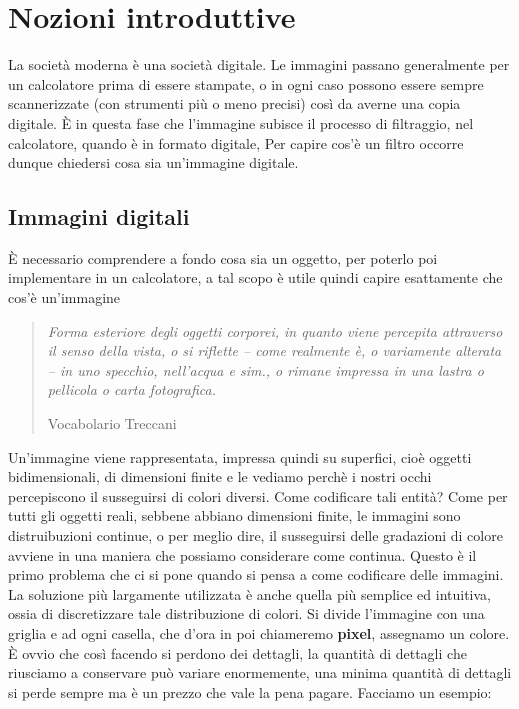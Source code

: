 \newpage
\section{Nozioni introduttive}
La società moderna è una società digitale. Le immagini passano generalmente per un calcolatore prima di essere stampate, o in ogni caso possono essere sempre scannerizzate (con strumenti più o meno precisi) così da averne una copia digitale.
\`E in questa fase che l'immagine subisce il processo di filtraggio, nel calcolatore, quando è in formato digitale, Per capire cos'è un filtro occorre dunque chiedersi cosa sia un'immagine digitale.

\subsection{Immagini digitali}
\`E necessario comprendere a fondo cosa sia un oggetto, per poterlo poi implementare in un calcolatore, a tal scopo è utile quindi capire esattamente che cos'è un'immagine

\begin{quote}
\epigraph{\textit{Forma esteriore degli oggetti corporei, in quanto viene percepita attraverso il senso della vista, o si riflette – come realmente è, o variamente alterata – in uno specchio, nell’acqua e sim., o rimane impressa in una lastra o pellicola o carta fotografica.}}{Vocabolario Treccani}
\end{quote}

\noindent
Un'immagine viene rappresentata, impressa quindi su superfici, cioè oggetti bidimensionali, di dimensioni finite e le vediamo perchè i nostri occhi percepiscono il susseguirsi di colori diversi. Come codificare tali entità?
Come per tutti gli oggetti reali, sebbene abbiano dimensioni finite, le immagini sono distruibuzioni continue, o per meglio dire, il susseguirsi delle gradazioni di colore avviene in una maniera che possiamo considerare come continua. Questo è il primo problema che ci si pone quando si pensa a come codificare delle immagini.\\
La soluzione più largamente utilizzata è anche quella più semplice ed intuitiva, ossia di discretizzare tale distribuzione di colori. Si divide l'immagine con una griglia e ad ogni casella, che d'ora in poi chiameremo \textbf{pixel}, assegnamo un colore.
\`E ovvio che così facendo si perdono dei dettagli, la quantità di dettagli che riusciamo a conservare può variare enormemente, una minima quantità di dettagli si perde sempre ma è un prezzo che vale la pena pagare.
\newpage
Facciamo un esempio:

